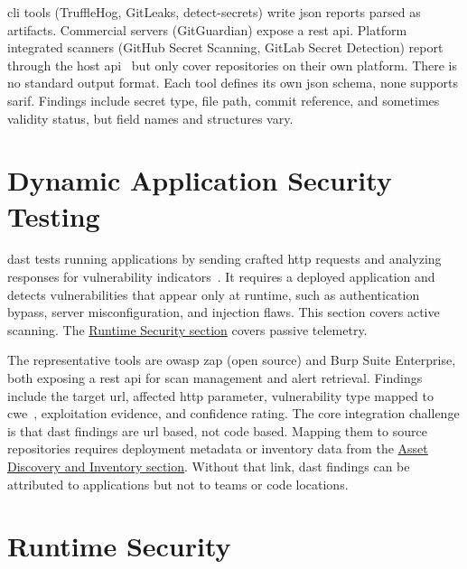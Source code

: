 \gls{cli} tools (TruffleHog, GitLeaks, detect-secrets) write \gls{json} reports parsed as artifacts. Commercial servers (GitGuardian) expose a \gls{rest} \gls{api}. Platform integrated scanners (GitHub Secret Scanning, GitLab Secret Detection) report through the host \gls{api}~\cite{GitHubAPI2024} but only cover repositories on their own platform. There is no standard output format. Each tool defines its own \gls{json} schema, none supports \gls{sarif}. Findings include secret type, file path, commit reference, and sometimes validity status, but field names and structures vary.


\section{Dynamic Application Security Testing}
\label{sec:dynamic-appsec}

\Gls{dast} tests running applications by sending crafted \gls{http} requests and analyzing responses for vulnerability indicators~\cite{Stuttard2011}. It requires a deployed application and detects vulnerabilities that appear only at runtime, such as authentication bypass, server misconfiguration, and injection flaws. This section covers active scanning. The \hyperref[sec:runtime-security]{Runtime Security section} covers passive telemetry.

The representative tools are \gls{owasp} \gls{zap} (open source) and Burp Suite Enterprise, both exposing a \gls{rest} \gls{api} for scan management and alert retrieval. Findings include the target \gls{url}, affected \gls{http} parameter, vulnerability type mapped to \gls{cwe}~\cite{CWE2024}, exploitation evidence, and confidence rating. The core integration challenge is that \gls{dast} findings are \gls{url} based, not code based. Mapping them to source repositories requires deployment metadata or inventory data from the \hyperref[sec:app-inventory]{Asset Discovery and Inventory section}. Without that link, \gls{dast} findings can be attributed to applications but not to teams or code locations.


\section{Runtime Security}
\label{sec:runtime-security}

